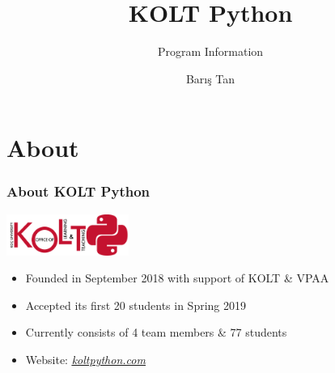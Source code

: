 

\usepackage{../KU-Beamer-Template/style/koc} 

\title{KOLT Python} 
\subtitle{Program Information} 
\date{}
\author{Barış Tan}




  \maketitle


  \section{About}

    \begin{frame}
      \frametitle{About KOLT Python}
      \pause
      \begin{center}
        \includegraphics[width=0.3\textwidth]{images/kolt_python_logo.png}
      \end{center}
      \Large
      \begin{itemize}
        \item Founded in September 2018 with support of KOLT \& VPAA
        \pause
        \item Accepted its first 20 students in Spring 2019
        \pause
        \item Currently consists of 4 team members \& 77 students
        \pause
        \item Website: \href{https://koltpython.com}{\underline{\textit{koltpython.com}}}
      \end{itemize}

    \end{frame}


